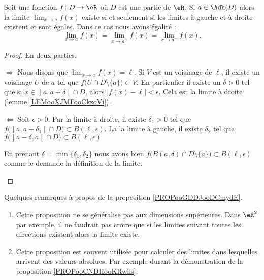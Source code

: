 \begin{proposition}      \label{PROPooGDDJooDCmydE}
	Soit une fonction \( f\colon D\to \eR\) où \( D\) est une partie de \( \eR\). Si \( a\in \Adh(D)\) alors la limite \( \lim_{x\to a} f(x)\) existe si et seulement si les limites à gauche et à droite existent et sont égales. Dans ce cas nous avons égalité :
	\begin{equation}
		\lim_{x\to a} f(x)=\lim_{x\to a^+} f(x)=\lim_{x\to a^-} f(x).
	\end{equation}
\end{proposition}

\begin{proof}
	En deux parties.
	\begin{subproof}
		\item[\( \Rightarrow\)]
		Nous disons que \( \lim_{x\to a} f(x)=\ell\). Si \( V\) est un voisinage de \( \ell\), il existe un voisinage \( U\) de \( a\) tel que \( f\big( U\cap D\setminus \{ a \} \big)\subset V\). En particulier il existe un \( \delta>0\) tel que si \( x\in \mathopen] a , a+\delta \mathclose[\cap D\), alors \( | f(x)-\ell |<\epsilon\). Cela est la limite à droite (lemme \ref{LEMooXJMFooCkzoVi}).
		\item[\( \Leftarrow\)]
		Soit \( \epsilon>0\). Par la limite à droite, il existe \( \delta_1>0\) tel que \( f\big( \mathopen] a , a+\delta_1 \mathclose[\cap D \big)\subset B(\ell,\epsilon)\). La la limite à gauche, il existe \( \delta_2\) tel que \( f\big( \mathopen] a-\delta , a \mathclose[\cap D \big)\subset B(\ell,\epsilon)\)

		En prenant \( \delta=\min\{ \delta_1,\delta_2 \}\) nous avons bien \( f\big( B(a,\delta)\cap D\setminus\{ a \} \big)\subset B(\ell,\epsilon)\) comme le demande la définition de la limite.
	\end{subproof}
\end{proof}

\begin{normaltext}
	Quelques remarques à propos de la proposition \ref{PROPooGDDJooDCmydE}.
	\begin{enumerate}
		\item
		      Cette proposition ne se généralise pas aux dimensions supérieures. Dans \( \eR^2\) par exemple, il ne faudrait pas croire que si les limites suivant toutes les directions existent alors la limite existe.
		\item
		      Cette proposition est souvent utilisée pour calculer des limites dans lesquelles arrivent des valeurs absolues. Par exemple durant la démonstration de la proposition \ref{PROPooCNDHooKRwils}.
	\end{enumerate}
\end{normaltext}

